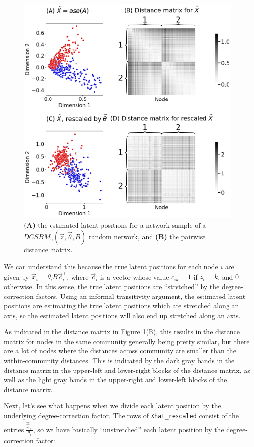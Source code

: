 \begin{figure}
    \centering
    \includegraphics[width=0.8\linewidth]{representations/ch6/Images/dcsbm_ase.png}
    \caption[LSE exmaple on DCSBM]{\textbf{(A)} the estimated latent positions for a network sample of a $DCSBM_n(\vec z, \vec\theta, B)$ random network, and \textbf{(B)} the pairwise distance matrix.}
    \label{fig:ch6:lse:dcsbm_ase}
\end{figure}
We can understand this because the true latent positions for each node $i$ are given by $\vec x_i = \theta_i B\vec c_i^\top$, where $\vec c_i$ is a vector whose value $c_{ik} = 1$ if $z_i = k$, and $0$ otherwise. In this sense, the true latent positions are ``stretched'' by the degree-correction factors. Using an informal transitivity argument, the estimated latent positions are estimating the true latent positions which are stretched along an axis, so the estimated latent positions will also end up stretched along an axis. 

As indicated in the distance matrix in Figure \ref{fig:ch6:lse:dcsbm_ase}(B), this results in the distance matrix for nodes in the same community generally being pretty similar, but there are a lot of nodes where the distances across community are smaller than the within-community distances. This is indicated by the dark gray bands in the distance matrix in the upper-left and lower-right blocks of the distance matrix, as well as the light gray bands in the upper-right and lower-left blocks of the distance matrix.

Next, let's see what happens when we divide each latent position by the underlying degree-correction factor. The rows of \texttt{Xhat\_rescaled} consist of the entries $\frac{\hat{ \vec x}_i^\top}{\theta_i}$, so we have basically ``unstretched'' each latent position by the degree-correction factor:

